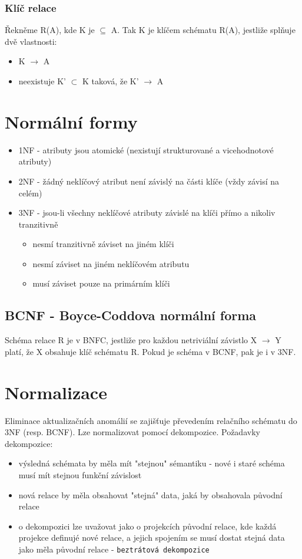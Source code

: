 \documentclass{szzclass}
\begin{document}
\subsubsection{Klíč relace}
Řekněme R(A), kde K je $\subseteq$ A. Tak K je klíčem schématu R(A), jestliže splňuje dvě vlastnosti:
\begin{itemize}
  \item K $\rightarrow$ A
  \item neexistuje K' $\subset$ K taková, že K' $\rightarrow$ A
\end{itemize}

\section{Normální formy}
\begin{itemize}
  \item 1NF - atributy jsou atomické (nexistují strukturované a vicehodnotové atributy)
  \item 2NF - žádný neklíčový atribut není závislý na části klíče (vždy závisí na celém)
  \item 3NF - jsou-li všechny neklíčové atributy závislé na klíči přímo a nikoliv tranzitivně
  \begin{itemize}
    \item nesmí tranzitivně záviset na jiném klíči
    \item nesmí záviset na jiném neklíčovém atributu
    \item musí záviset pouze na primárním klíči
  \end{itemize}
\end{itemize}
\subsection{BCNF - Boyce-Coddova normální forma}
Schéma relace R je v BNFC, jestliže pro každou netriviální závistlo X $\rightarrow$ Y platí, že X obsahuje klíč schématu R. Pokud je schéma v BCNF,
pak je i v 3NF.

\section{Normalizace}
Eliminace aktualizačních anomálií se zajišťuje převedením relačního schématu do 3NF (resp. BCNF). Lze normalizovat pomocí dekompozice.
Požadavky dekompozice:
\begin{itemize}
  \item výsledná schémata by měla mít "stejnou" sémantiku - nové i staré schéma musí mít stejnou funkční závislost
  \item nová relace by měla obsahovat "stejná" data, jaká by obsahovala původní relace
  \item o dekompozici lze uvažovat jako o projekcích původní relace, kde každá projekce definujé nové relace, a jejich spojením se musí dostat
  stejná data jako měla původní relace - \texttt{beztrátová dekompozice}
\end{itemize}
\end{document}
